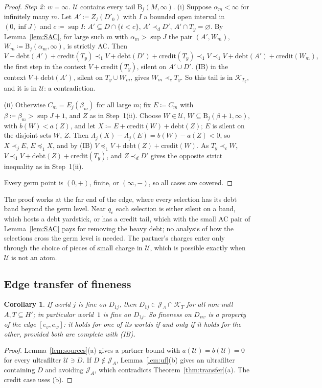 \documentclass[11pt]{article}
\newtheorem{corollary}[theorem]{Corollary}
\theoremstyle{definition}\newtheorem{definition}[theorem]{Definition}
\theoremstyle{remark}\newtheorem{remark}[theorem]{Remark}
\newcommand{\debt}{\mathrm{debt}}
\newcommand{\cred}{\mathrm{credit}}
\newcommand{\Band}{\mathrm{B}}
\newcommand{\Jid}{\mathcal J}
\newcommand{\Kid}{\mathcal K}
\newcommand{\Uf}{\mathcal U}
\begin{document}
\begin{proof}
\emph{Step 2: $w=\infty$.} $\Uf$ contains every tail $\Band_j(M,\infty)$.
(i) Suppose $\alpha_m<\infty$ for infinitely many $m$. Let
$A'\coloneqq Z_I(D'_0)$ with $I$ a bounded open interval in $(0,\inf J)$
and $c\coloneqq\sup I$: $A'\subseteq D\cap\{t<c\}$, $A'\prec_dD'$,
$A'\cap T_y=\varnothing$. By Lemma~\ref{lem:SAC}, for large such $m$ with
$\alpha_m>\sup J$ the pair $(A',W_m)$, $W_m\coloneqq\Band_j(\alpha_m,\infty)$,
is strictly AC. Then
\[
 V+\debt(A')+\cred(T_y)\prec_1V+\debt(D')+\cred(T_y)\prec_1V
 \prec_1V+\debt(A')+\cred(W_m),
\]
the first step in the context $V+\cred(T_y)$, silent on $A'\cup D'$. (IB) in
the context $V+\debt(A')$, silent on $T_y\cup W_m$, gives $W_m\prec_cT_y$.
So this tail is in $\Kid_{T_y}$, and it is in $\Uf$: a contradiction.

(ii) Otherwise $C_m=E_j(\beta_m)$ for all large $m$; fix
$E\coloneqq C_m$ with $\beta\coloneqq\beta_m>\sup J+1$, and $Z$ as in
Step~1(ii). Choose $W\in\Uf$, $W\subseteq\Band_j(\beta+1,\infty)$, with
$b(W)<a(Z)$, and let $X\coloneqq E+\cred(W)+\debt(Z)$; $E$ is silent on the
disjoint sets $W$, $Z$. Then $\Lambda_j(X)-\Lambda_j(E)=b(W)-a(Z)<0$, so
$X\prec_jE$, $E\preceq_1X$, and by (IB) $V\preceq_1V+\debt(Z)+\cred(W)$. As
$T_y\prec_cW$, $V\prec_1V+\debt(Z)+\cred(T_y)$, and $Z\prec_dD'$ gives the
opposite strict inequality as in Step~1(ii).

Every germ point is $(0,+)$, finite, or $(\infty,-)$, so all cases are
covered.
\end{proof}

The proof works at the far end of the edge, where every selection has its
debt band beyond the germ level. Near $q_e$ each selection is either silent
on a band, which hosts a debt yardstick, or has a credit tail, which with the
small AC pair of Lemma~\ref{lem:SAC} pays for removing the heavy debt; no
analysis of how the selections cross the germ level is needed. The partner's
charges enter only through the choice of pieces of small charge in $\Uf$,
which is possible exactly when $\Uf$ is not an atom.

\subsection{Edge transfer of fineness}\label{sec:edgefine}

\begin{corollary}\label{cor:edgefine}
If world $j$ is fine on $D_{1j}$, then $D_{1j}\in\Jid_A\cap\Kid_T$ for all
non-null $A,T\subseteq H'$; in particular world~$1$ is fine on $D_{1j}$. So
fineness on $D_{vw}$ is a property of the edge $[e_v,e_w]$: it holds for
one of its worlds if and only if it holds for the other, provided both are
complete with (IB).
\end{corollary}
\begin{proof}
Lemma~\ref{lem:sources}(a) gives a partner bound with $a(\Uf)=b(\Uf)=0$ for
every ultrafilter $\Uf\ni D$. If $D\notin\Jid_A$, Lemma~\ref{lem:uf}(b) gives
an ultrafilter containing $D$ and avoiding $\Jid_A$, which contradicts
Theorem~\ref{thm:transfer}(a). The credit case uses (b).
\end{proof}
\end{document}
